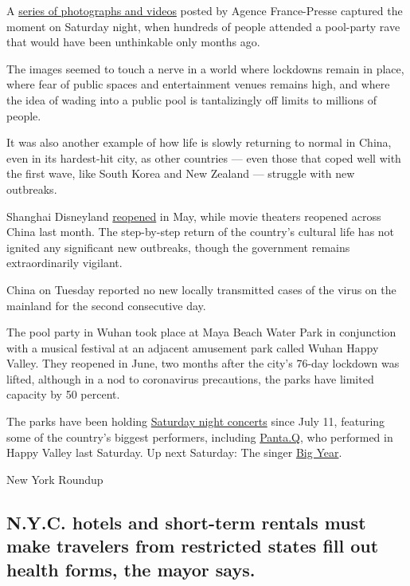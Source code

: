 A \href{https://twitter.com/AFP/status/1295345558270488577}{series of
photographs and videos} posted by Agence France-Presse captured the
moment on Saturday night, when hundreds of people attended a pool-party
rave that would have been unthinkable only months ago.

The images seemed to touch a nerve in a world where lockdowns remain in
place, where fear of public spaces and entertainment venues remains
high, and where the idea of wading into a public pool is tantalizingly
off limits to millions of people.

It was also another example of how life is slowly returning to normal in
China, even in its hardest-hit city, as other countries --- even those
that coped well with the first wave, like South Korea and New Zealand
--- struggle with new outbreaks.

Shanghai Disneyland
\href{https://www.nytimes3xbfgragh.onion/2020/05/11/business/shanghai-disneyland-reopens.html}{reopened}
in May, while movie theaters reopened across China last month. The
step-by-step return of the country's cultural life has not ignited any
significant new outbreaks, though the government remains extraordinarily
vigilant.

China on Tuesday reported no new locally transmitted cases of the virus
on the mainland for the second consecutive day.

The pool party in Wuhan took place at Maya Beach Water Park in
conjunction with a musical festival at an adjacent amusement park called
Wuhan Happy Valley. They reopened in June, two months after the city's
76-day lockdown was lifted, although in a nod to coronavirus
precautions, the parks have limited capacity by 50 percent.

The parks have been holding
\href{https://card.weibo.com/article/m/show/id/2309404535006629593210?_wb_client_=1}{Saturday
night concerts} since July 11, featuring some of the country's biggest
performers, including
\href{https://baike.baidu.com/item/Panta.Q/22260865}{Panta.Q,} who
performed in Happy Valley last Saturday. Up next Saturday: The singer
\href{https://www.echinesesong.com/tag/bigyear-da-nian-\%E5\%A4\%A7\%E5\%B9\%B4/}{Big
Year}.

New York Roundup

\hypertarget{nyc-hotels-and-short-term-rentals-must-make-travelers-from-restricted-states-fill-out-health-forms-the-mayor-says}{%
\subsection{N.Y.C. hotels and short-term rentals must make travelers
from restricted states fill out health forms, the mayor
says.}\label{nyc-hotels-and-short-term-rentals-must-make-travelers-from-restricted-states-fill-out-health-forms-the-mayor-says}}


